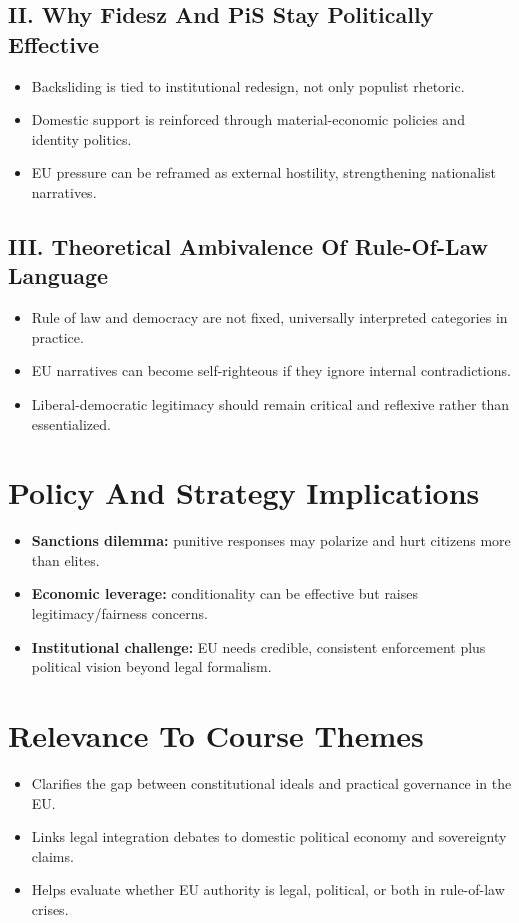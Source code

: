 \documentclass[11pt,a4paper]{article}
\begin{document}
\subsection*{II. Why Fidesz And PiS Stay Politically Effective}
\begin{itemize}
\item Backsliding is tied to institutional redesign, not only populist rhetoric.
\item Domestic support is reinforced through material-economic policies and identity politics.
\item EU pressure can be reframed as external hostility, strengthening nationalist narratives.
\end{itemize}

\subsection*{III. Theoretical Ambivalence Of Rule-Of-Law Language}
\begin{itemize}
\item Rule of law and democracy are not fixed, universally interpreted categories in practice.
\item EU narratives can become self-righteous if they ignore internal contradictions.
\item Liberal-democratic legitimacy should remain critical and reflexive rather than essentialized.
\end{itemize}

\section*{Policy And Strategy Implications}
\begin{itemize}
\item \textbf{Sanctions dilemma:} punitive responses may polarize and hurt citizens more than elites.
\item \textbf{Economic leverage:} conditionality can be effective but raises legitimacy/fairness concerns.
\item \textbf{Institutional challenge:} EU needs credible, consistent enforcement plus political vision beyond legal formalism.
\end{itemize}

\section*{Relevance To Course Themes}
\begin{itemize}
\item Clarifies the gap between constitutional ideals and practical governance in the EU.
\item Links legal integration debates to domestic political economy and sovereignty claims.
\item Helps evaluate whether EU authority is legal, political, or both in rule-of-law crises.
\end{itemize}
\end{document}
